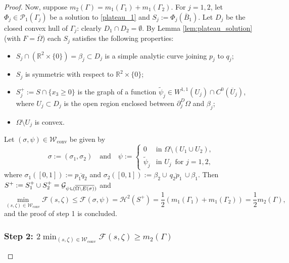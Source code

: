 \documentclass[JEP,XML,SOM,Unicode, NoFloatCountersInSection,published]{cedram}
\newcommand{\R}{\mathbb{R}}
\let\Om\Omega
\newcommand\admclassconv{{\mathcal W_\mathrm{conv}}}
\newcommand{\resa}{\mathop{\hbox{\vrule height 7pt width 0.5pt depth 0pt
\vrule height 0.5pt width 6pt depth 0pt}}\nolimits}
\newcommand{\resb}{\mathop{\hbox{\vrule height 4pt width 0.5pt depth 0pt
\vrule height 0.5pt width 3pt depth 0pt}}\nolimits}
\newcommand{\res}{\mathchoice{\resa}{\resa}{\resb}{\resb}}
\theoremstyle{definition}
\begin{document}
\begin{proof}
Now, suppose $m_2(\Gamma)=m_1(\Gamma_1)+m_1(\Gamma_2)$.
For $j=1,2$,
let $\Phi_j\in \mathcal{P}_1(\Gamma_j)$ be a solution to \eqref{plateau_1}
and $S_j:=\Phi_j(\overline B_1)$.
Let $D_j$ be the closed convex hull of $\Gamma_j$: clearly $D_1\cap D_2=\emptyset$. By Lemma \ref{lem:plateau_solution} (with $F=\overline\Om$) each $S_j$ satisfies the following properties:
\begin{itemize}
\item $S_j\cap(\R^2\times\{0\})=\beta_j\subset D_j$ is a simple {analytic} curve joining $p_j$ to $q_j$;
\item $S_j$ is symmetric with respect to $\R^2\times\{0\}$;
\item $S_j^+:=S\cap\{x_3\ge0\}$ is the graph of a function $\widetilde \psi_j\in W^{1,1}(U_j)\cap C^0(\overline U_j)$, where $U_j\subset D_j$ is the open region enclosed between $\partial^D_j\Om$ and $\beta_j$;
\item
$\Om\setminus U_j$ is convex.
\end{itemize}
Let $(\sigma,\psi)\in\admclassconv$ be given by
\begin{equation*}
\sigma:=(\sigma_1,\sigma_2)\quad\text{and}\quad\psi:=\begin{cases}
0&\text{in } \Om\setminus (U_1\cup U_2),\\
\widetilde{\psi}_j&\text{in } U_j\, \text{ for }j=1,2,
\end{cases}
\end{equation*}
where $\sigma_1([0,1]):=\overline{p_1q_2}$
and $\sigma_2([0,1]):=\beta_2\cup\,\overline{q_2p_1}\,\cup\beta_1$.
Then $S^+:=S^+_1\cup S^+_2=\mathcal{G}_{\psi\res(\overline{\Om\setminus E(\sigma)})}$ and
\begin{equation*}
\min_{(s,\zeta)\in\admclassconv}\mathcal{F}(s,\zeta)\le \mathcal{F}(\sigma,\psi)=\mathcal{H}^2(S^+)=\frac12(m_1(\Gamma_1)+m_1(\Gamma_2))=\frac12m_2(\Gamma),
\end{equation*}
and the proof of step 1 is concluded.

\subsubsection*{Step 2:
$2\min_{(s,\zeta)\in \admclassconv}\mathcal F(s,\zeta)\ge m_2(\Gamma)$}


\end{proof}
\end{document}
